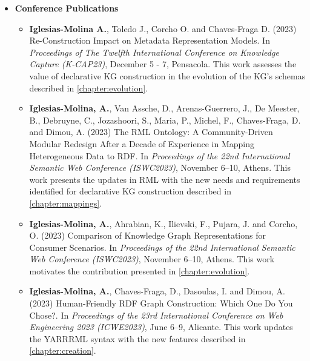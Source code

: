 \begin{itemize}
    \item \textbf{Conference Publications}
    \begin{itemize}
        \item \textbf{Iglesias-Molina A.}, Toledo J., Corcho O. and Chaves-Fraga D. (2023) Re-Construction Impact on Metadata Representation Models. In \textit{Proceedings of The Twelfth International Conference on Knowledge Capture (K-CAP23)}, December 5 - 7, Pensacola. This work assesses the value of declarative KG construction in the evolution of the KG's schemas described in \cref{chapter:evolution}.
    
        \item \textbf{Iglesias-Molina, A.}, Van Assche, D., Arenas-Guerrero, J., De Meester, B., Debruyne, C., Jozashoori, S., Maria, P., Michel, F., Chaves-Fraga, D. and Dimou, A. (2023) The RML Ontology: A Community-Driven Modular Redesign After a Decade of Experience in Mapping Heterogeneous Data to RDF. In \textit{Proceedings of the 22nd International Semantic Web Conference (ISWC2023)}, November 6--10, Athens. This work presents the updates in RML with the new needs and requirements identified for declarative KG construction described in \cref{chapter:mappings}. 
    
        \item \textbf{Iglesias-Molina, A.}, Ahrabian, K., Ilievski, F., Pujara, J. and Corcho, O. (2023) Comparison of Knowledge Graph Representations for Consumer Scenarios. In \textit{Proceedings of the 22nd International Semantic Web Conference (ISWC2023)}, November 6--10, Athens. This work motivates the contribution presented in \cref{chapter:evolution}.
    
        \item \textbf{Iglesias-Molina, A.}, Chaves-Fraga, D., Dasoulas, I. and Dimou, A. (2023) Human-Friendly RDF Graph Construction: Which One Do You Chose?. In \textit{Proceedings of the 23rd International Conference on Web Engineering 2023 (ICWE2023)}, June 6--9, Alicante. This work updates the YARRRML syntax with the new features described in \cref{chapter:creation}.
    \end{itemize}
\end{itemize}

